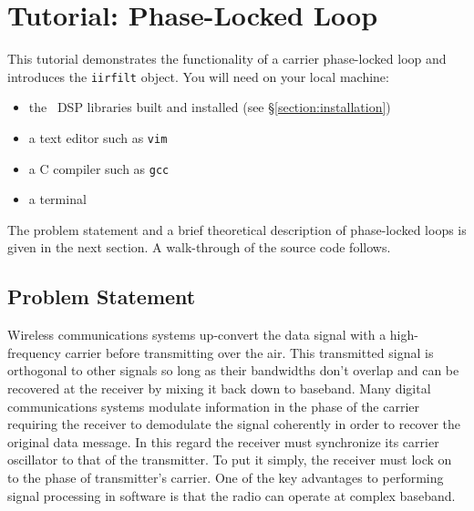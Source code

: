 % 
%

\newpage
\section{Tutorial: Phase-Locked Loop}
\label{tutorial:pll}
This tutorial demonstrates the functionality of a carrier phase-locked
loop and introduces the {\tt iirfilt} object.
%
You will need on your local machine:
\begin{itemize}
\item the \liquid\ DSP libraries built and installed (see
      \S\ref{section:installation})
\item a text editor such as {\tt vim} \cite{vim:web}
\item a C compiler such as {\tt gcc} \cite{gcc:web}
\item a terminal
\end{itemize}
%
The problem statement and a brief theoretical description of
phase-locked loops is given in the next section.
A walk-through of the source code follows.

\subsection{Problem Statement}
\label{tutorial:pll:problem}
Wireless communications systems up-convert the data signal with
a high-frequency carrier before transmitting over the air.
This transmitted signal is orthogonal to other signals so long as
their bandwidths don't overlap and can be recovered at the receiver by
mixing it back down to baseband.
Many digital communications systems modulate information in the phase of
the carrier requiring the receiver to demodulate the signal coherently
in order to recover the original data message.
In this regard the receiver must synchronize its carrier oscillator to
that of the transmitter.
To put it simply, the receiver must lock on to the phase of
transmitter's carrier.
One of the key advantages to performing signal processing in software is
that the radio can operate at complex baseband.

